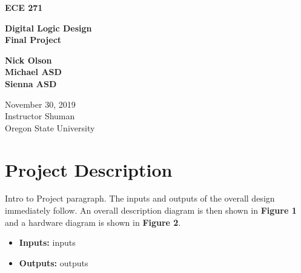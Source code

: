 \documentclass[a4paper]{article}
\begin{document}
\begin{titlepage}
 \begin{center}
  \vspace*{3cm}

  \large\textbf{ECE 271}

  \vspace{2cm}

  \huge\textbf{Digital Logic Design\\Final Project}

  \vspace{.5cm}

  \large\textbf{Nick Olson\\Michael ASD\\Sienna ASD}

  \vfill

  \normalsize November 30, 2019\\
  Instructor Shuman\\
  Oregon State University

  \vspace{0.8cm}
 \end{center}
\end{titlepage}



\tableofcontents
\listoffigures



\newpage



\FloatBarrier
\newpage
\FloatBarrier



\section{Project Description}
Intro to Project paragraph. The inputs and outputs of the overall design immediately follow. An overall description diagram is then shown in \textbf{Figure 1} and a hardware diagram is shown in \textbf{Figure 2}.

\begin{itemize}
  \item \textbf{Inputs:  } inputs
  \item \textbf{Outputs: } outputs
\end{itemize}
\end{document}
